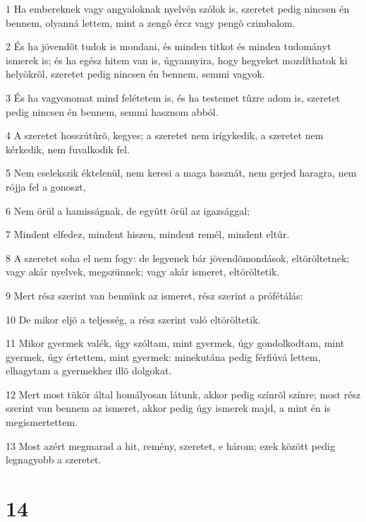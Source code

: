 \par 1 Ha embereknek vagy angyaloknak nyelvén szólok is, szeretet pedig nincsen én bennem, olyanná lettem, mint a zengõ ércz vagy pengõ czimbalom.
\par 2 És ha jövendõt tudok is mondani, és minden titkot és minden tudományt ismerek is; és ha egész hitem  van is, úgyannyira, hogy hegyeket mozdíthatok ki helyökrõl, szeretet pedig nincsen én bennem, semmi vagyok.
\par 3 És ha vagyonomat mind felétetem is, és ha testemet tûzre adom is, szeretet pedig nincsen én bennem, semmi hasznom abból.
\par 4 A szeretet hosszútûrõ, kegyes; a szeretet nem irígykedik, a szeretet nem kérkedik, nem fuvalkodik fel.
\par 5 Nem cselekszik éktelenül, nem keresi a maga hasznát, nem gerjed haragra, nem rójja fel a gonoszt,
\par 6 Nem örül a hamisságnak, de együtt örül az igazsággal;
\par 7 Mindent elfedez, mindent hiszen, mindent remél, mindent eltûr.
\par 8 A szeretet soha el nem fogy: de legyenek bár jövendõmondások, eltöröltetnek; vagy akár nyelvek, megszünnek; vagy akár ismeret, eltöröltetik.
\par 9 Mert rész szerint van bennünk az ismeret, rész szerint a prófétálás:
\par 10 De mikor eljõ a teljesség, a rész szerint való eltöröltetik.
\par 11 Mikor gyermek valék, úgy szóltam, mint gyermek, úgy gondolkodtam, mint gyermek, úgy értettem, mint gyermek: minekutána pedig férfiúvá lettem, elhagytam a gyermekhez illõ dolgokat.
\par 12 Mert most tükör által homályosan látunk, akkor pedig színrõl színre; most rész szerint van bennem az ismeret, akkor pedig úgy ismerek majd, a mint én is megismertettem.
\par 13 Most azért megmarad a hit, remény, szeretet, e három; ezek között pedig legnagyobb a szeretet.

\chapter{14}

